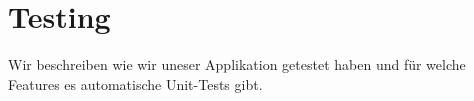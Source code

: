 \chapter{Testing}
\label{chap:Testing}

Wir beschreiben wie wir uneser Applikation getestet haben und für welche Features es automatische Unit-Tests gibt.




